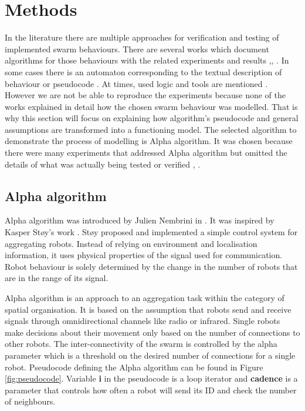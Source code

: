 \section{Methods}
In the literature there are multiple approaches for verification and testing of implemented swarm behaviours. There are several works which document algorithms for those behaviours with the related experiments and results \cite{Formal_Verification_of_Probabilistic_Swarm_Behaviours},\cite{Towards_Temporal_Verification_of_Emergent_Behaviours_in_Swarm_Robotic_Systems}, \cite{Property-driven_design_for_swarm_robotics}. In some cases there is an automaton corresponding to the textual description of behaviour or pseudocode \cite{Formal_Verification_of_Probabilistic_Swarm_Behaviours}. At times, used logic and tools are mentioned \cite{Property-driven_design_for_swarm_robotics}. However we are not be able to reproduce the experiments because none of the works explained in detail how the chosen swarm behaviour was modelled. That is why this section will focus on explaining how algorithm's pseudocode and general assumptions are transformed into a functioning model. The selected algorithm to demonstrate the process of modelling is Alpha algorithm. It was chosen because there were many experiments that addressed Alpha algorithm but omitted the details of what was actually being tested or verified \cite{Towards_Temporal_Verification_of_Emergent_Behaviours_in_Swarm_Robotic_Systems}, \cite{On_Formal_Specification_of_Emergent_Behaviours_in_Swarm_Robotic_Systems}.

\subsection{Alpha algorithm}
Alpha algorithm was introduced by Julien Nembrini in \cite{Minimalist_Coherent_Swarming_of_Wireless_Networked_Autonomous_Mobile_Robots}. It was inspired by Kasper Støy's work \cite{Using_Situated_Communication_in_Distributed_Autonomous_Mobile_Robotics}. Støy proposed and implemented a simple control system for aggregating robots. Instead of relying on environment and localisation information, it uses physical properties of the signal used for communication. Robot behaviour is solely determined by the change in the number of robots that are in the range of its signal.

Alpha algorithm is an approach to an aggregation task within the category of spatial organisation. It is based on the assumption that robots send and receive signals through omnidirectional channels like radio or infrared. Single robots make decisions about their movement only based on the number of connections to other robots. The inter-connectivity of the swarm is controlled by the alpha parameter which is a threshold on the desired number of connections for a single robot. Pseudocode defining the Alpha algorithm can be found in Figure \ref{fig:pseudocode}. Variable \textbf{i} in the pseudocode is a loop iterator and \textbf{cadence} is a parameter that controls how often a robot will send its ID and check the number of neighbours.

